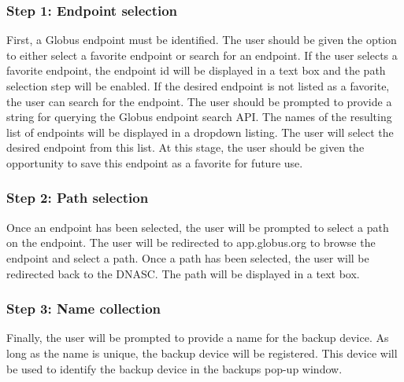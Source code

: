 \subsubsection{Step 1: Endpoint selection}

First, a Globus endpoint must be identified. The user should be given the option
to either select a favorite endpoint or search for an endpoint. If the user
selects a favorite endpoint, the endpoint id will be displayed in a text box
and the path selection step will be enabled. If the desired endpoint is not
listed as a favorite, the user can search for the endpoint.
The user should be prompted to provide
a string for querying the Globus endpoint search API. The names of the resulting 
list of endpoints will be displayed in a dropdown listing. The user will select
the desired endpoint from this list. At this stage, the user should be given the
opportunity to save this endpoint as a favorite for future use.

\subsubsection{Step 2: Path selection}

Once an endpoint has been selected, the user will be prompted to select a path
on the endpoint. The user will be redirected to app.globus.org to browse the
endpoint and select a path. Once a path has been selected, the user will be
redirected back to the DNASC. The path will be displayed in a text box.

\subsubsection{Step 3: Name collection}

Finally, the user will be prompted to provide a name for the backup device. 
As long as the name is unique, the backup device will be registered.
This device will be used to identify the backup device in the backups pop-up window.
